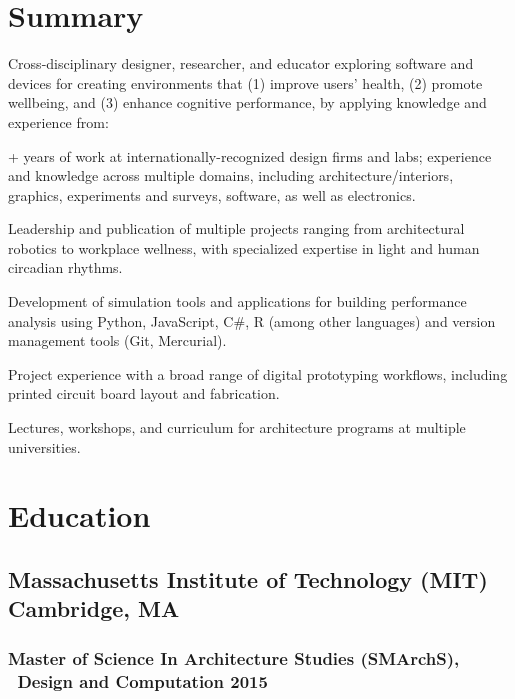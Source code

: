 \documentclass[letterpaper, oneside, 10pt]{article}
\begin{document}
\StartCV%

\section*{Summary} %

Cross-disciplinary designer, researcher, and educator exploring software and
devices for creating environments that (1) improve users’ health, (2) promote
wellbeing, and (3) enhance cognitive performance, by applying knowledge and
experience from:

\DotSep{0.25em} + years of work at
internationally-recognized design firms and labs; experience and knowledge
across multiple domains, including architecture/interiors, graphics,
experiments and surveys, software, as well as electronics.

\DotSep{0.25em} Leadership and publication of multiple
projects ranging from architectural robotics to workplace wellness, with
specialized expertise in light and human circadian rhythms.

\DotSep{0.25em} Development of simulation tools and
applications for building performance analysis using Python, JavaScript,
C\#, R (among other languages) and version management tools (Git,
Mercurial).

\DotSep{0.25em} Project experience with a broad
range of digital prototyping workflows, including printed circuit board
 layout and fabrication.

\DotSep{0.25em} Lectures, workshops, and
curriculum for architecture programs at multiple universities.




\section*{Education} %
\AdjSectSpace

\subsection*{%
  Massachusetts Institute of Technology (MIT)%
  \DotSep{0.25em} Cambridge, MA%
}
  \subsubsection*{%
    Master of Science In Architecture Studies (SMArchS),%
    \ Design and Computation\DotSep{0.25em} 2015%
  }
    \\%
\end{document}
